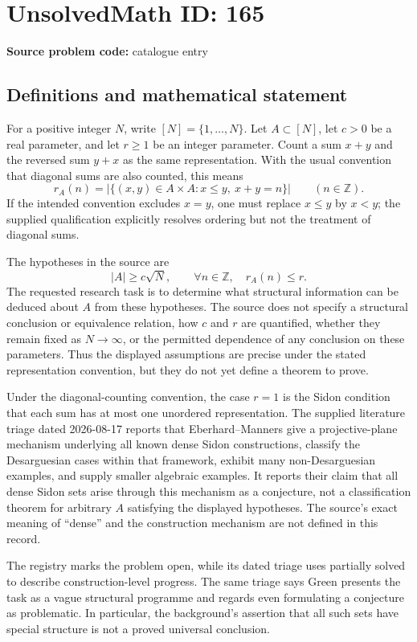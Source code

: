 \documentclass[11pt]{article}
\newcommand{\Z}{\mathbb{Z}}
\begin{document}
\section*{UnsolvedMath ID: 165}
\textbf{Source problem code:} catalogue entry
\subsection{Definitions and mathematical statement}
For a positive integer $N$, write $[N]=\{1,\ldots,N\}$. Let $A\subset[N]$, let $c>0$ be a real parameter, and let $r\geq1$ be an integer parameter. Count a sum $x+y$ and the reversed sum $y+x$ as the same representation. With the usual convention that diagonal sums are also counted, this means
\[
r_A(n)=|\{(x,y)\in A\times A:x\leq y,\ x+y=n\}|\qquad(n\in\Z).
\]
If the intended convention excludes $x=y$, one must replace $x\leq y$ by $x<y$; the supplied qualification explicitly resolves ordering but not the treatment of diagonal sums.

The hypotheses in the source are
\[
|A|\geq c\sqrt N,\qquad \forall n\in\Z,\quad r_A(n)\leq r.
\]
The requested research task is to determine what structural information can be deduced about $A$ from these hypotheses. The source does not specify a structural conclusion or equivalence relation, how $c$ and $r$ are quantified, whether they remain fixed as $N\to\infty$, or the permitted dependence of any conclusion on these parameters. Thus the displayed assumptions are precise under the stated representation convention, but they do not yet define a theorem to prove.

Under the diagonal-counting convention, the case $r=1$ is the Sidon condition that each sum has at most one unordered representation. The supplied literature triage dated 2026-08-17 reports that Eberhard--Manners give a projective-plane mechanism underlying all known dense Sidon constructions, classify the Desarguesian cases within that framework, exhibit many non-Desarguesian examples, and supply smaller algebraic examples. It reports their claim that all dense Sidon sets arise through this mechanism as a conjecture, not a classification theorem for arbitrary $A$ satisfying the displayed hypotheses. The source's exact meaning of ``dense'' and the construction mechanism are not defined in this record.

The registry marks the problem open, while its dated triage uses partially solved to describe construction-level progress. The same triage says Green presents the task as a vague structural programme and regards even formulating a conjecture as problematic. In particular, the background's assertion that all such sets have special structure is not a proved universal conclusion.
\end{document}
